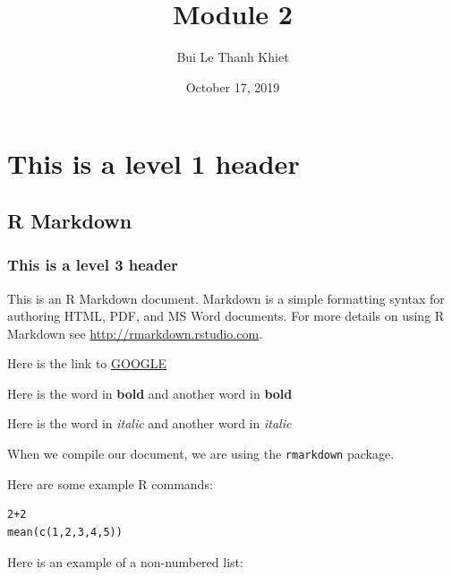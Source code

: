 \documentclass[]{article}
\title{Module 2}
\author{Bui Le Thanh Khiet}
\date{October 17, 2019}
\begin{document}
\maketitle

\section{This is a level 1 header}\label{this-is-a-level-1-header}

\subsection{R Markdown}\label{r-markdown}

\subsubsection{This is a level 3 header}\label{this-is-a-level-3-header}

This is an R Markdown document. Markdown is a simple formatting syntax
for authoring HTML, PDF, and MS Word documents. For more details on
using R Markdown see \url{http://rmarkdown.rstudio.com}.

Here is the link to \href{http://google.com}{GOOGLE}

Here is the word in \textbf{bold} and another word in \textbf{bold}

Here is the word in \emph{italic} and another word in \emph{italic}

When we compile our document, we are using the \texttt{rmarkdown}
package.

Here are some example R commands:

\begin{verbatim}
2+2
mean(c(1,2,3,4,5))
\end{verbatim}

Here is an example of a non-numbered list:
\end{document}
